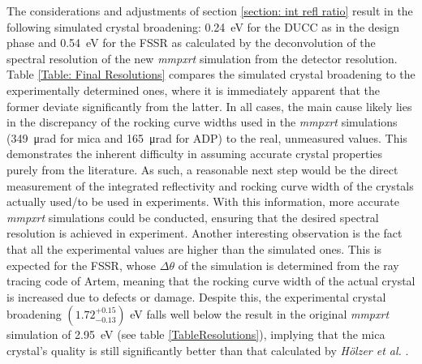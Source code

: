 The considerations and adjustments of section \ref{section: int refl ratio} result in the following simulated crystal broadening: \SI{0.24}{\electronvolt} for the DUCC as in the design phase and \SI{0.54}{\electronvolt} for the FSSR as calculated by the deconvolution of the spectral resolution of the new \textit{mmpxrt} simulation from the detector resolution. Table \ref{Table: Final Resolutions} compares the simulated crystal broadening to the experimentally determined ones, where it is immediately apparent that the former deviate significantly from the latter. In all cases, the main cause likely lies in the discrepancy of the rocking curve widths used in the \textit{mmpxrt} simulations (\SI{349}{\micro\radian} for mica and \SI{165}{\micro\radian} for ADP) to the real, unmeasured values. This demonstrates the inherent difficulty in assuming accurate crystal properties purely from the literature. As such, a reasonable next step would be the direct measurement of the integrated reflectivity and rocking curve width of the crystals actually used/to be used in experiments. With this information, more accurate \textit{mmpxrt} simulations could be conducted, ensuring that the desired spectral resolution is achieved in experiment. Another interesting observation is the fact that all the experimental values are higher than the simulated ones. This is expected for the FSSR, whose $\Delta \theta$ of the simulation is determined from the ray tracing code of Artem, meaning that the rocking curve width of the actual crystal is increased due to defects or damage. Despite this, the experimental crystal broadening $\left(1.72^{+0.15}_{-0.13}\right)$ eV falls well below the result in the original \textit{mmpxrt} simulation of \SI{2.95}{\electronvolt} (see table \ref{TableResolutions}), implying that the mica crystal's quality is still significantly better than that calculated by \textit{Hölzer et al.} \citep{holzer1998flat}.

